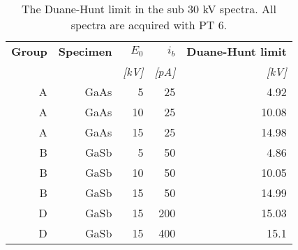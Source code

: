 \begin{table}[htbp]
    \begin{center}
        \caption{
            The Duane-Hunt limit in the sub 30 kV spectra.
            All spectra are acquired with PT 6.
        }
        \label{tab:results:duane_hunt}
        \begin{tabular}{rrrrr}
            \hline
            \textbf{Group} & \textbf{Specimen} & \textbf{$E_0$} & \textbf{$i_b$} & \textbf{Duane-Hunt limit} \\
            \emph{}        & \emph{}           & \emph{[kV]}    & \emph{[pA]}    & \emph{[kV]}               \\
            \hline
            A              & GaAs              & 5              & 25             & 4.92                      \\
            A              & GaAs              & 10             & 25             & 10.08                     \\
            A              & GaAs              & 15             & 25             & 14.98                     \\
            B              & GaSb              & 5              & 50             & 4.86                      \\
            B              & GaSb              & 10             & 50             & 10.05                     \\
            B              & GaSb              & 15             & 50             & 14.99                     \\
            D              & GaSb              & 15             & 200            & 15.03                     \\
            D              & GaSb              & 15             & 400            & 15.1                      \\
            \hline
        \end{tabular}
    \end{center}
\end{table}
